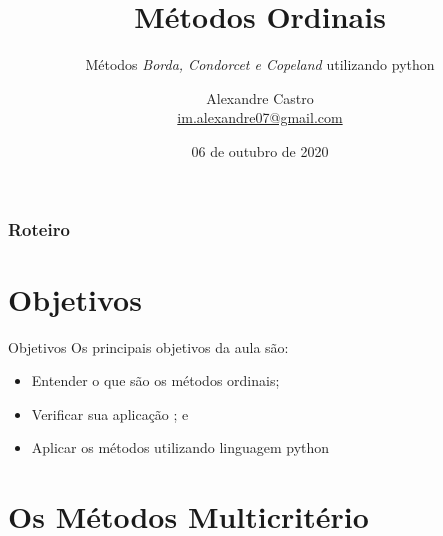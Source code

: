\documentclass[aspectratio=169]{beamer}
\title[Métodos Ordinais]{Métodos Ordinais}
\subtitle{Métodos \textit{Borda, Condorcet e Copeland} utilizando python}
\begin{document}
\author[M. Alexandre P. C. Junior]{
    \begin{tabular}{c} 
        \Large
        Alexandre Castro\\
        \footnotesize \href{mailto:im.alexandre07@gmail.com}{im.alexandre07@gmail.com}
    \end{tabular}}


\date{06 de outubro de 2020}


\begin{frame}\maketitle\end{frame}


\begin{frame}
    \frametitle{Roteiro}
\end{frame}

\section{Objetivos}
\begin{frame}{Objetivos}
    Os principais objetivos da aula são:
    \begin{itemize}[<+- | uncover@+>]
        \item Entender o que são os métodos ordinais;
        \item Verificar sua aplicação ; e
        \item \alert{Aplicar os métodos utilizando linguagem python}
    \end{itemize}
\end{frame}

\section{Os Métodos Multicritério}
\end{document}
